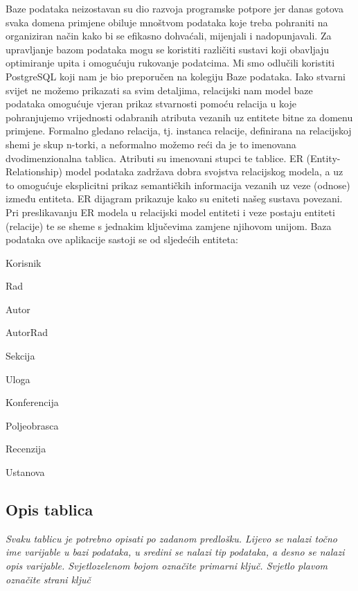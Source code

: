 		Baze podataka neizostavan su dio razvoja programske potpore jer danas gotova svaka domena primjene obiluje mnoštvom podataka koje treba pohraniti na organiziran način kako bi se efikasno dohvaćali, mijenjali i nadopunjavali. Za upravljanje bazom podataka mogu se koristiti različiti sustavi koji obavljaju optimiranje upita i omogućuju rukovanje podatcima. Mi smo odlučili koristiti PostgreSQL koji nam je bio preporučen na kolegiju Baze podataka. \newline Iako stvarni svijet ne možemo prikazati sa svim detaljima, relacijski nam model baze podataka omogućuje vjeran prikaz stvarnosti pomoću relacija u koje pohranjujemo vrijednosti odabranih atributa vezanih uz entitete bitne za domenu primjene. Formalno gledano relacija, tj. instanca relacije, definirana na relacijskoj shemi je skup n-torki, a neformalno možemo reći da je to imenovana dvodimenzionalna tablica. Atributi su imenovani stupci te tablice. ER (Entity-Relationship) model podataka zadržava dobra svojstva relacijskog modela, a uz to omogućuje eksplicitni prikaz semantičkih informacija vezanih uz veze (odnose) između entiteta. ER dijagram prikazuje kako su eniteti našeg sustava povezani. Pri preslikavanju ER modela u relacijski model entiteti i veze postaju entiteti (relacije) te se sheme s jednakim ključevima zamjene njihovom unijom.
		Baza podataka ove aplikacije sastoji se od sljedećih entiteta:
		\begin{packed_item}
			\item Korisnik
			\item Rad
			\item Autor
			\item AutorRad
			\item Sekcija
			\item Uloga
			\item Konferencija
			\item Poljeobrasca
			\item Recenzija
			\item Ustanova
		\end{packed_item}
		
			\subsection{Opis tablica}
			

				\textit{Svaku tablicu je potrebno opisati po zadanom predlošku. Lijevo se nalazi točno ime varijable u bazi podataka, u sredini se nalazi tip podataka, a desno se nalazi opis varijable. Svjetlozelenom bojom označite primarni ključ. Svjetlo plavom označite strani ključ}
				

